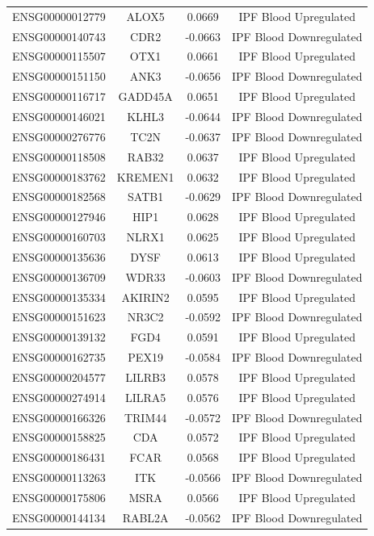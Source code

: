 \documentclass[
]{article}
\begin{document}
\begin{singlespace}
\begin{longtable}[t]{lccc}
ENSG00000012779 & ALOX5 & 0.0669 & IPF Blood Upregulated\\
\addlinespace
ENSG00000140743 & CDR2 & -0.0663 & IPF Blood Downregulated\\
ENSG00000115507 & OTX1 & 0.0661 & IPF Blood Upregulated\\
ENSG00000151150 & ANK3 & -0.0656 & IPF Blood Downregulated\\
ENSG00000116717 & GADD45A & 0.0651 & IPF Blood Upregulated\\
ENSG00000146021 & KLHL3 & -0.0644 & IPF Blood Downregulated\\
\addlinespace
ENSG00000276776 & TC2N & -0.0637 & IPF Blood Downregulated\\
ENSG00000118508 & RAB32 & 0.0637 & IPF Blood Upregulated\\
ENSG00000183762 & KREMEN1 & 0.0632 & IPF Blood Upregulated\\
ENSG00000182568 & SATB1 & -0.0629 & IPF Blood Downregulated\\
ENSG00000127946 & HIP1 & 0.0628 & IPF Blood Upregulated\\
\addlinespace
ENSG00000160703 & NLRX1 & 0.0625 & IPF Blood Upregulated\\
ENSG00000135636 & DYSF & 0.0613 & IPF Blood Upregulated\\
ENSG00000136709 & WDR33 & -0.0603 & IPF Blood Downregulated\\
ENSG00000135334 & AKIRIN2 & 0.0595 & IPF Blood Upregulated\\
ENSG00000151623 & NR3C2 & -0.0592 & IPF Blood Downregulated\\
\addlinespace
ENSG00000139132 & FGD4 & 0.0591 & IPF Blood Upregulated\\
ENSG00000162735 & PEX19 & -0.0584 & IPF Blood Downregulated\\
ENSG00000204577 & LILRB3 & 0.0578 & IPF Blood Upregulated\\
ENSG00000274914 & LILRA5 & 0.0576 & IPF Blood Upregulated\\
ENSG00000166326 & TRIM44 & -0.0572 & IPF Blood Downregulated\\
\addlinespace
ENSG00000158825 & CDA & 0.0572 & IPF Blood Upregulated\\
ENSG00000186431 & FCAR & 0.0568 & IPF Blood Upregulated\\
ENSG00000113263 & ITK & -0.0566 & IPF Blood Downregulated\\
ENSG00000175806 & MSRA & 0.0566 & IPF Blood Upregulated\\
ENSG00000144134 & RABL2A & -0.0562 & IPF Blood Downregulated\\

\end{longtable}
\end{singlespace}
\end{document}

